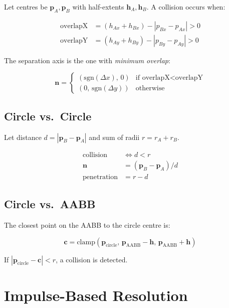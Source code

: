 Let centres be $\mathbf{p}_A, \mathbf{p}_B$ with half-extents
$\mathbf{h}_A, \mathbf{h}_B$. A collision occurs when:

\begin{align}
  \text{overlapX} &= (h_{Ax} + h_{Bx}) - |p_{Bx} - p_{Ax}| > 0 \\
  \text{overlapY} &= (h_{Ay} + h_{By}) - |p_{By} - p_{Ay}| > 0
\end{align}

The separation axis is the one with \emph{minimum overlap}:

\begin{equation}
\mathbf{n} =
\begin{cases}
  (\text{sgn}(\Delta x),\, 0) & \text{if overlapX} < \text{overlapY} \\
  (0,\, \text{sgn}(\Delta y)) & \text{otherwise}
\end{cases}
\end{equation}

\subsection{Circle vs.\ Circle}

Let distance $d = |\mathbf{p}_B - \mathbf{p}_A|$ and sum of radii
$r = r_A + r_B$.

\begin{align}
  \text{collision} &\Leftrightarrow d < r \\
  \mathbf{n} &= (\mathbf{p}_B - \mathbf{p}_A) / d \\
  \text{penetration} &= r - d
\end{align}

\subsection{Circle vs.\ AABB}

The closest point on the AABB to the circle centre is:

\begin{equation}
\mathbf{c} = \text{clamp}(\mathbf{p}_\text{circle},\,
             \mathbf{p}_\text{AABB} - \mathbf{h},\,
             \mathbf{p}_\text{AABB} + \mathbf{h})
\end{equation}

If $|\mathbf{p}_\text{circle} - \mathbf{c}| < r$, a collision is detected.

\section{Impulse-Based Resolution}

